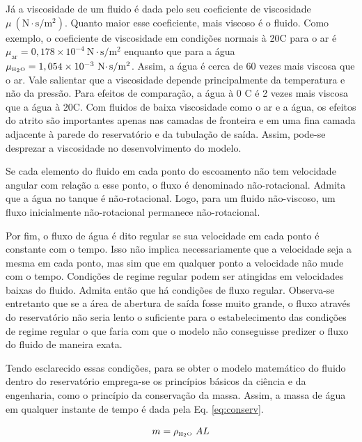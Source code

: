 Já a viscosidade de um fluido é dada pelo seu coeficiente de viscosidade $\mu\
(\text{N}\cdotp \text{s}/\text{m}^2)$. Quanto maior esse coeficiente, mais
viscoso é o fluido. Como exemplo, o coeficiente de viscosidade em condições
normais à 20\textdegree C para o ar é $\mu_{\text{ar}} = 0,178 \times 10^{-4}\
\text{N}\cdotp \text{s}/\text{m}^2$ enquanto que para a água
$\mu_{\tiny \text{\tiny H}_2\text{\tiny O}} = 1,054 \times 10^{-3}\
\text{N}\cdotp \text{s}/\text{m}^2$. Assim, a água é cerca de 60 vezes mais
viscosa que o ar.  Vale salientar que a viscosidade depende principalmente da
temperatura e não da pressão. Para efeitos de comparação, a água à 0\textdegree
C é 2 vezes mais viscosa que a água à 20\textdegree C. Com fluidos de baixa
viscosidade como o ar e a água, os efeitos do atrito são importantes apenas nas
camadas de fronteira e em uma fina camada adjacente à parede do reservatório e
da tubulação de saída.  Assim, pode-se desprezar a viscosidade no
desenvolvimento do modelo.

\Glossary{$\mu_{\text{ar}}$}{Coeficiente de viscosidade do ar}

Se cada elemento do fluido em cada ponto do escoamento não tem velocidade
angular com relação a esse ponto, o fluxo é denominado não-rotacional. Admita
que a água no tanque é não-rotacional. Logo, para um fluido não-viscoso, um
fluxo inicialmente não-rotacional permanece não-rotacional.

Por fim, o fluxo de água é dito regular se sua velocidade em cada ponto é
constante com o tempo. Isso não implica necessariamente que a velocidade seja a
mesma em cada ponto, mas sim que em qualquer ponto a velocidade não mude com o
tempo. Condições de regime regular podem ser atingidas em velocidades baixas do
fluido. Admita então que há condições de fluxo regular. Observa-se entretanto
que se a área de abertura de saída fosse muito grande, o fluxo através do
reservatório não seria lento o suficiente para o estabelecimento das
condições de regime regular o que faria com que o modelo não conseguisse
predizer o fluxo do fluido de maneira exata.

Tendo esclarecido essas condições, para se obter o modelo matemático do fluido
dentro do reservatório emprega-se os princípios básicos da ciência e da
engenharia, como o princípio da conservação da massa. Assim, a massa de água em
qualquer instante de tempo é dada pela Eq. \ref{eq:conserv}.

\begin{equation}\label{eq:conserv}
m = \rho_{\tiny \text{\tiny H}_2\text{\tiny O}}\ AL
\end{equation}

